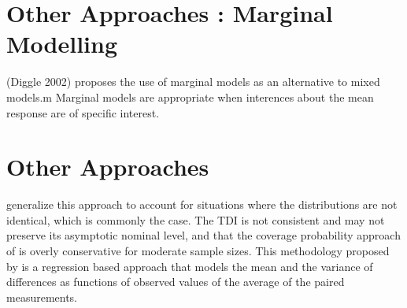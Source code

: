 \documentclass[12pt, a4paper]{report}
\theoremstyle{plain}
\theoremstyle{definition}
\theoremstyle{remark}
\begin{document}
\section{Other Approaches : Marginal Modelling}
(Diggle 2002) proposes the use of marginal models as an
alternative to mixed models.m Marginal models are appropriate when
interences about the mean response are of specific interest.

\section{Other Approaches}


\citet{pkcng} generalize this approach to account for situations
where the distributions are not identical, which is commonly the
case. The TDI is not consistent and may not preserve its
asymptotic nominal level, and that the coverage probability
approach of \citet{lin2002} is overly conservative for moderate
sample sizes. This methodology proposed by \citet{pkcng} is a
regression based approach that models the mean and the variance of
differences as functions of observed values of the average of the
paired measurements.



\end{document}
